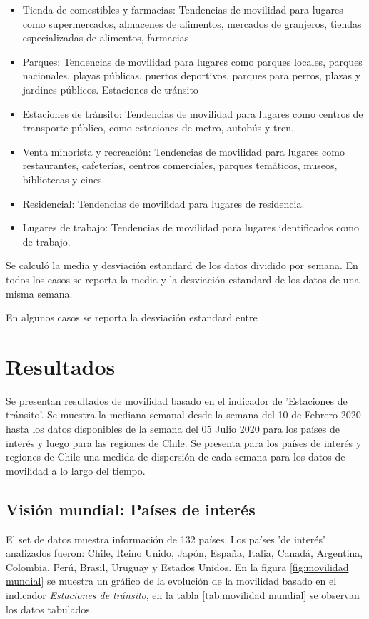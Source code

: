 \documentclass{article}
\newcommand\fechafinal{05 Julio 2020 }
\begin{document}
\begin{itemize}
	\item Tienda de comestibles y farmacias: Tendencias de movilidad para lugares como supermercados, almacenes de alimentos, mercados de granjeros, tiendas especializadas de alimentos, farmacias
	\item Parques: Tendencias de movilidad para lugares como parques locales, parques nacionales, playas públicas, puertos deportivos, parques para perros, plazas y jardines públicos.
	Estaciones de tránsito
	\item Estaciones de tránsito: Tendencias de movilidad para lugares como centros de transporte público, como estaciones de metro, autobús y tren.
	\item Venta minorista y recreación:	Tendencias de movilidad para lugares como restaurantes, cafeterías, centros comerciales, parques temáticos, museos, bibliotecas y cines.
	\item Residencial: Tendencias de movilidad para lugares de residencia.
	\item Lugares de trabajo: Tendencias de movilidad para lugares identificados como de trabajo.
	
\end{itemize}

Se calculó la media y desviación estandard de los datos dividido por semana. En todos los casos se reporta la media y la desviación estandard de los datos de una misma semana.

En algunos casos se reporta la desviación estandard entre

\section{Resultados}

Se presentan resultados de movilidad basado en el indicador de 'Estaciones de tránsito'. Se muestra la mediana semanal desde la semana del 10 de Febrero 2020 hasta los datos disponibles de  la semana del \fechafinal para los países de interés y luego para las regiones de Chile. Se presenta para los países de interés y regiones de Chile una medida de dispersión de cada semana para los datos de movilidad a lo largo del tiempo.


\subsection{Visión mundial: Países de interés}
El set de datos muestra información de 132 países.
Los países 'de interés' analizados fueron: Chile, Reino Unido, Japón, España, Italia, Canadá, Argentina, Colombia, Perú, Brasil, Uruguay y Estados Unidos. En la figura \ref{fig:movilidad mundial} se muestra un gráfico de la evolución de la movilidad basado en el indicador \textit{Estaciones de tránsito}, en la tabla \ref{tab:movilidad mundial} se observan los datos tabulados.
\end{document}
